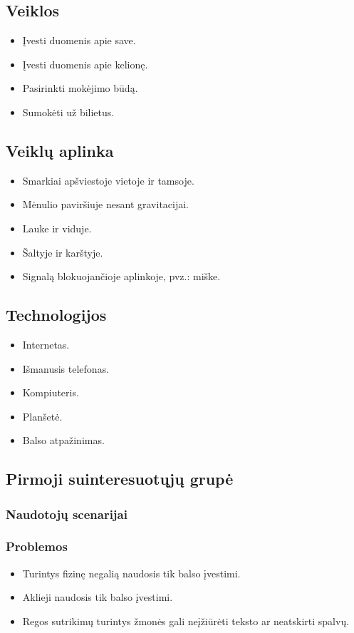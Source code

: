 \documentclass{VUMIFPSkursinis}
\begin{document}
\subsection{Veiklos}
\begin{itemize}
\item Įvesti duomenis apie save.
\item Įvesti duomenis apie kelionę.
\item Pasirinkti mokėjimo būdą.
\item Sumokėti už bilietus.
\end{itemize}

\subsection{Veiklų aplinka}
\begin{itemize}
\item Smarkiai apšviestoje vietoje ir tamsoje.
\item Mėnulio paviršiuje nesant gravitacijai.
\item Lauke ir viduje.
\item Šaltyje ir karštyje.
\item Signalą blokuojančioje aplinkoje, pvz.: miške.
\end{itemize}

\subsection{Technologijos}
\begin{itemize}
\item Internetas.
\item Išmanusis telefonas.
\item Kompiuteris.
\item Planšetė.
\item Balso atpažinimas.
\end{itemize}

\subsection{Pirmoji suinteresuotųjų grupė}

\subsubsection{Naudotojų scenarijai}

\subsubsection{Problemos}
\begin{itemize}
\item Turintys fizinę negalią naudosis tik balso įvestimi.
\item Aklieji naudosis tik balso įvestimi.
\item Regos sutrikimų turintys žmonės gali neįžiūrėti teksto ar neatskirti spalvų.
\end{itemize}
\end{document}
